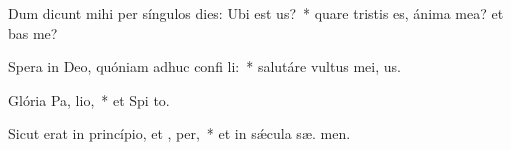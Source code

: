 \item Dum dicunt mihi per síngulos dies: Ubi est  us?~* quare tristis es, ánima mea? et  bas me?
\item Spera in Deo, quóniam adhuc confi li:~* salutáre vultus mei,   us.
\item Glória Pa,  lio,~* et Spi to.
\item Sicut erat in princípio, et ,  per,~* et in sǽcula sæ. men.
